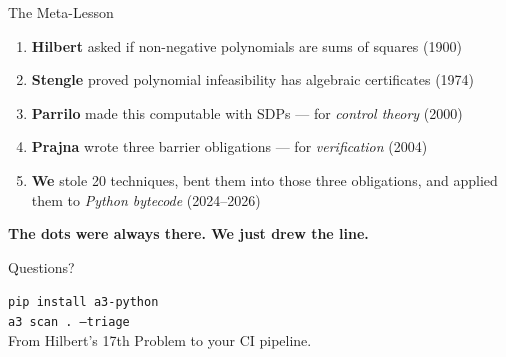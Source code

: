 \documentclass[aspectratio=169]{beamer}
\begin{document}
\begin{frame}{The Meta-Lesson}
\begin{center}
\end{center}

\vspace{1em}
\begin{enumerate}
  \item \textbf{Hilbert} asked if non-negative polynomials are sums of squares (1900)
  \item \textbf{Stengle} proved polynomial infeasibility has algebraic certificates (1974)
  \item \textbf{Parrilo} made this computable with SDPs --- for \emph{control theory} (2000)
  \item \textbf{Prajna} wrote three barrier obligations --- for \emph{verification} (2004)
  \item \textbf{We} stole 20 techniques, bent them into those three obligations, and applied them to \emph{Python bytecode} (2024--2026)
\end{enumerate}

\vspace{0.5em}
\centering
\large\textbf{The dots were always there. We just drew the line.}
\end{frame}

\begin{frame}[standout]
\Large Questions?

\vspace{1em}
\normalsize
\texttt{pip install a3-python}\\[4pt]
\texttt{a3 scan . --triage}\\[12pt]
\small From Hilbert's 17th Problem to your CI pipeline.
\end{frame}
\end{document}
